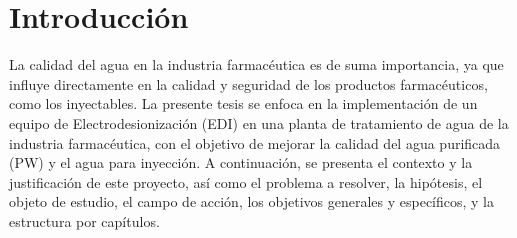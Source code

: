 \chapter{Introducción}

La calidad del agua en la industria farmacéutica es de suma importancia, ya que influye directamente en la calidad y seguridad de los productos farmacéuticos, como los inyectables. La presente tesis se enfoca en la implementación de un equipo de Electrodesionización (EDI) en una planta de tratamiento de agua de la industria farmacéutica, con el objetivo de mejorar la calidad del agua purificada (PW) y el agua para inyección. A continuación, se presenta el contexto y la justificación de este proyecto, así como el problema a resolver, la hipótesis, el objeto de estudio, el campo de acción, los objetivos generales y específicos, y la estructura por capítulos.\\











